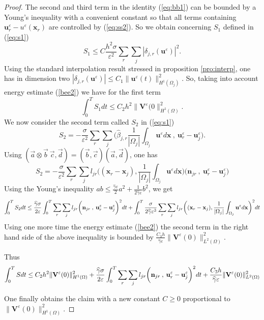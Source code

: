 \documentclass[a4paper,french,english,10pt]{article}
\newcommand\ljr{l_{jr}}
\newcommand\njr{\mathbf{n}_{jr}}
\newcommand\uu{\mathbf{u}}
\newcommand\eps{\varepsilon}
\newcommand\x{\mathbf{x}}
\newcommand\V{\mathbf{V}}
\begin{document}
\begin{proof}
The second and third term in the identity (\ref{eq:bb1}) can be bounded
by a Young's inequality with a convenient constant
so that all terms containing $ \textbf{u}_r^{\eps}-u^\eps(\x_r)$
are controlled by (\ref{eq:ss2}).
So we obtain concerning $S_1$ defined in (\ref{eq:s1})
\begin{equation*} \label{eq:ss4}
S_1
\leq C\frac{h^2\sigma }{\eps^2}\sum_r \sum_j  \left|  \delta_{j,r}(\textbf{u}^{\eps}) \right|^2.
\end{equation*}
Using the standard interpolation result stressed in proposition \ref{pro:interp},
one has in dimension two
$| \delta_{j,r}(\textbf{u}^{\eps}) |
 \leq C_1  \|\uu^\eps(t)\|^2_{H^1(\Omega_j)} $. 
So, taking into account energy estimate (\ref{bee2})
we have for the first term
\begin{equation*} \label{eq:ss6}
\int_0^T S_1dt \leq C_2 h^2  \|\V^\eps(0\|^2_{H^1(\Omega)}.
\end{equation*}
We now consider the second term called  $S_2$ in (\ref{eq:s1})
\begin{equation*} \label{eq:ss5}
S_2=-\frac{\sigma}{\eps^2} \sum_r \sum_j  \bigg( \widehat{\beta}_{j,r}
\frac{1}{|\Omega_j|}\int_{\Omega_j} \uu^{\eps} d\x  \: , \:
\textbf{u}_r^{\eps}-\textbf{u}_j^{\eps} \bigg) .
\end{equation*}
Using $(\vec{a}\otimes\vec{b}\:\vec{c},\vec{d}) 
= (\vec{b},\vec{c})(\vec{a},\vec{d})$, one has 
\begin{equation*}
S_2 = -\frac{\sigma}{\eps^2} \sum_r
\sum_j \ljr \bigg( (\x_r-\x_j), \frac{1}{|\Omega_j|}\int_{\Omega_j}
\uu^{\eps} d\x \bigg) \bigg(  \njr  \: , \:
\textbf{u}_r^{\eps}-\textbf{u}_j^{\eps} \bigg)
\end{equation*}
Using the  Young's inequality  $ab \leq \frac{\widehat \gamma \eps }2 a^2+\frac1{2\widehat \gamma \eps } b^2 $, we get
$$\int_0^T
S_2 dt \leq \frac{\widehat{\gamma} \sigma}{2\eps}\int_0^T\sum_r \sum_j \ljr \bigg( 
\njr  \: , \: \textbf{u}_r^{\eps}-\textbf{u}_j^{\eps} \bigg)^2 dt\\
+
\int_0^T\frac{\sigma}{2\widehat{\gamma}  \eps^3}\sum_r \sum_j \ljr \bigg( (\x_r-\x_j),
\frac{1}{|\Omega_j|}\int_{\Omega_j} \uu^{\eps} d\x \bigg) ^2dt
$$
Using one more time the energy estimate (\ref{bee2}) the second term in the right hand side of the above inequality  is bounded by $\frac{C_3h}{\widehat{\gamma}\eps}\|\V^\eps(0)\|^2_{ L^2(\Omega)}$. 

Thus 
$$
\int _0^TS dt \leq 
C_2 h^2  \|\V^\eps(0)\|^2_{H^1(\Omega)}
+
\frac{\widehat{\gamma} \sigma}{2\eps}\int_0^T\sum_r \sum_j \ljr \bigg( 
\njr  \: , \: \textbf{u}_r^{\eps}-\textbf{u}_j^{\eps} \bigg)^2 dt\\
+
\frac{C_3h}{\widehat{\gamma}\eps}\|\V^\eps(0)\|^2_{ L^2(\Omega)}
$$


One finally obtains
the claim
 with a new constant $C\geq0$ proportional to $\|\V^\eps(0)\|^2_{H^1(\Omega)} $.
\end{proof}
\end{document}
